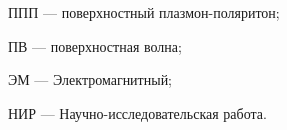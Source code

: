\documentclass[times]{itmo-student-thesis}
\begin{document}




%
%
%

\tableofcontents

\setlength{\parindent}{0cm} %
ППП --- поверхностный плазмон-поляритон;

ПВ --- поверхностная волна;

ЭМ --- Электромагнитный;

НИР --- Научно-исследовательская работа.

\setlength{\parindent}{1.25cm} %











\printmainbibliography


\end{document}

